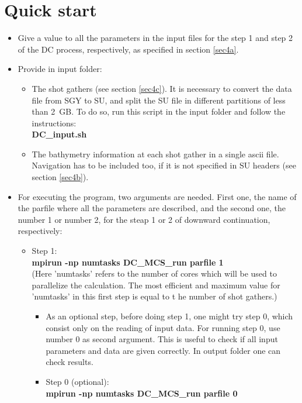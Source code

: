 \documentclass[11pt, oneside]{article}   	%
\begin{document}
\section{Quick start}\label{sec3}
\begin{itemize}
\item Give a value to all the parameters in the input files for the step 1 and step 2 of the DC process, respectively, as specified in section \ref{sec4a}. 
\item Provide in input folder:
\begin{itemize}
\item The shot gathers (see section \ref{sec4c}). It is necessary to convert the data file from SGY to SU, and split the SU file in different partitions of less than 2~GB. To do so, run this script in the input folder and follow the instructions:\\
  \textbf{DC\_input.sh}
\item The bathymetry information at each shot gather in a single ascii file. Navigation has to be included too, if it is not specified in SU headers (see section \ref{sec4b}).
 \end{itemize}
 \item For executing the program, two arguments are needed. First one, the name of the parfile where all the parameters are described, and the second one, the number 1 or number 2, for the steap 1 or 2 of downward continuation, respectively:
 	\begin{itemize}
	\item Step 1: \\ 
 	\textbf{mpirun -np numtasks DC\_MCS\_run parfile 1}\\
 	(Here 'numtasks' refers to the number of cores which will be used to parallelize the calculation. The most efficient and maximum value for 'numtasks' in this first step is equal to t	he number of shot gathers.)
	 	\begin{itemize}
		\item As an optional step, before doing step 1, one might try step 0, which consist only on the reading of input data. For running step 0, use number 0 as second argument. This is useful to check if all input parameters and data are given correctly. In output folder one can check results.
		\item Step 0 (optional): \\ 
 		\textbf{mpirun -np numtasks DC\_MCS\_run parfile 0}\\
 	 \end{itemize}


\end{itemize}
\end{itemize}
\end{document}

